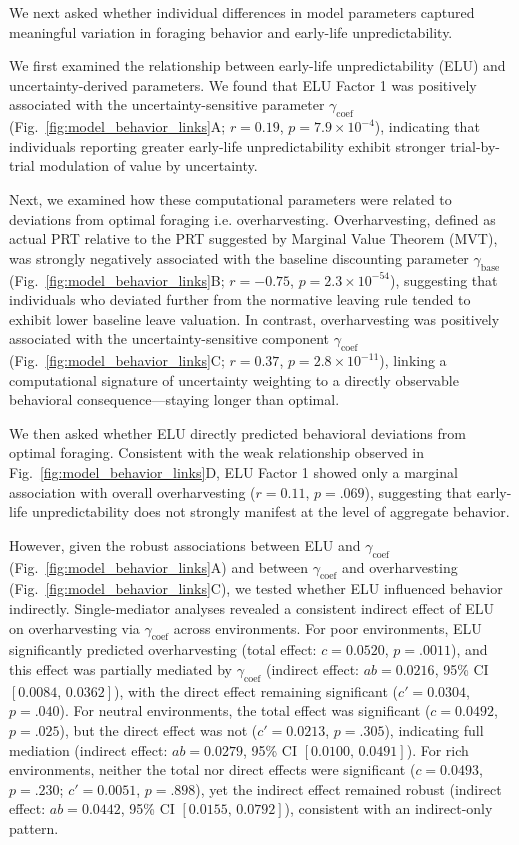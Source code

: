 \documentclass[12pt]{article}
\begin{document}
We next asked whether individual differences in model parameters captured meaningful variation in foraging behavior and early-life unpredictability.

We first examined the relationship between early-life unpredictability (ELU) and uncertainty-derived parameters. We found that ELU Factor 1 was positively associated with the uncertainty-sensitive parameter $\gamma_{\text{coef}}$ (Fig.~\ref{fig:model_behavior_links}A; $r=0.19$, $p=7.9\times10^{-4}$), indicating that individuals reporting greater early-life unpredictability exhibit stronger trial-by-trial modulation of value by uncertainty.

Next, we examined how these computational parameters were related to deviations from optimal foraging i.e. overharvesting. Overharvesting, defined as actual PRT relative to the PRT suggested by Marginal Value Theorem (MVT), was strongly negatively associated with the baseline discounting parameter $\gamma_{\text{base}}$ (Fig.~\ref{fig:model_behavior_links}B; $r=-0.75$, $p=2.3\times10^{-54}$), suggesting that individuals who deviated further from the normative leaving rule tended to exhibit lower baseline leave valuation. In contrast, overharvesting was positively associated with the uncertainty-sensitive component $\gamma_{\text{coef}}$ (Fig.~\ref{fig:model_behavior_links}C; $r=0.37$, $p=2.8\times10^{-11}$), linking a computational signature of uncertainty weighting to a directly observable behavioral consequence—staying longer than optimal.

We then asked whether ELU directly predicted behavioral deviations from optimal foraging. Consistent with the weak relationship observed in Fig.~\ref{fig:model_behavior_links}D, ELU Factor 1 showed only a marginal association with overall overharvesting ($r=0.11$, $p=.069$), suggesting that early-life unpredictability does not strongly manifest at the level of aggregate behavior.

However, given the robust associations between ELU and $\gamma_{\text{coef}}$ (Fig.~\ref{fig:model_behavior_links}A) and between $\gamma_{\text{coef}}$ and overharvesting (Fig.~\ref{fig:model_behavior_links}C), we tested whether ELU influenced behavior indirectly. Single-mediator analyses revealed a consistent indirect effect of ELU on overharvesting via $\gamma_{\text{coef}}$ across environments. For poor environments, ELU significantly predicted overharvesting (total effect: $c=0.0520$, $p=.0011$), and this effect was partially mediated by $\gamma_{\text{coef}}$ (indirect effect: $ab=0.0216$, 95\% CI $[0.0084,\,0.0362]$), with the direct effect remaining significant ($c'=0.0304$, $p=.040$). For neutral environments, the total effect was significant ($c=0.0492$, $p=.025$), but the direct effect was not ($c'=0.0213$, $p=.305$), indicating full mediation (indirect effect: $ab=0.0279$, 95\% CI $[0.0100,\,0.0491]$). For rich environments, neither the total nor direct effects were significant ($c=0.0493$, $p=.230$; $c'=0.0051$, $p=.898$), yet the indirect effect remained robust (indirect effect: $ab=0.0442$, 95\% CI $[0.0155,\,0.0792]$), consistent with an indirect-only pattern.
\end{document}
